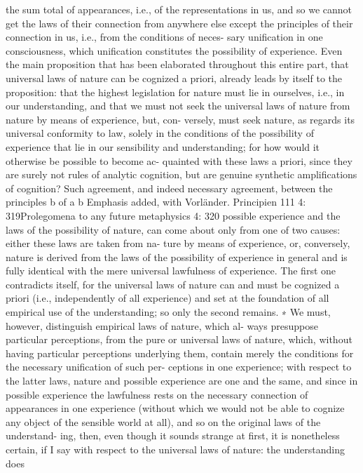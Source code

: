 the sum total of appearances, i.e., of the representations in us, and so we
cannot get the laws of their connection from anywhere else except the
principles of their connection in us, i.e., from the conditions of neces-
sary uniﬁcation in one consciousness, which uniﬁcation constitutes the
possibility of experience.
Even the main proposition that has been elaborated throughout this
entire part, that universal laws of nature can be cognized a priori, already
leads by itself to the proposition: that the highest legislation for nature
must lie in ourselves, i.e., in our understanding, and that we must not seek
the universal laws of nature from nature by means of experience, but, con-
versely, must seek nature, as regards its universal conformity to law, solely
in the conditions of the possibility of experience that lie in our sensibility
and understanding; for how would it otherwise be possible to become ac-
quainted with these laws a priori, since they are surely not rules of analytic
cognition, but are genuine synthetic ampliﬁcations of cognition? Such
agreement, and indeed necessary agreement, between the principles b of
a
b
Emphasis added, with Vorländer.
Principien
111
4: 319Prolegomena to any future metaphysics
4: 320
possible experience and the laws of the possibility of nature, can come
about only from one of two causes: either these laws are taken from na-
ture by means of experience, or, conversely, nature is derived from the
laws of the possibility of experience in general and is fully identical with
the mere universal lawfulness of experience. The ﬁrst one contradicts
itself, for the universal laws of nature can and must be cognized a priori
(i.e., independently of all experience) and set at the foundation of all
empirical use of the understanding; so only the second remains. ∗
We must, however, distinguish empirical laws of nature, which al-
ways presuppose particular perceptions, from the pure or universal laws
of nature, which, without having particular perceptions underlying them,
contain merely the conditions for the necessary uniﬁcation of such per-
ceptions in one experience; with respect to the latter laws, nature and
possible experience are one and the same, and since in possible experience
the lawfulness rests on the necessary connection of appearances in one
experience (without which we would not be able to cognize any object of
the sensible world at all), and so on the original laws of the understand-
ing, then, even though it sounds strange at ﬁrst, it is nonetheless certain,
if I say with respect to the universal laws of nature: the understanding does
